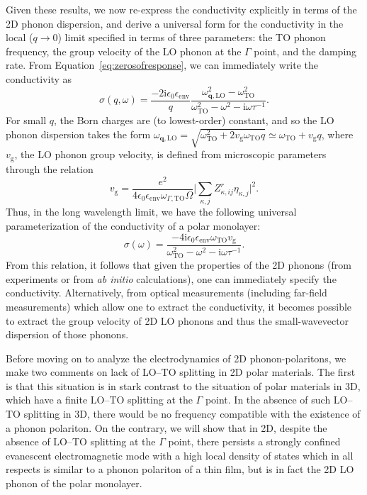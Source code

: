 \documentclass[aps,prb,twocolumn,
	           groupedaddress,superscriptaddress,
               amsfonts,amssymb,amsmath,floatfix,
	           citeautoscript]{revtex4-1}
\newcommand{\iu}{\mathrm{i}}
\begin{document}
Given these results, we now re-express the conductivity explicitly in terms of the 2D phonon dispersion, and derive a universal form for the conductivity in the local ($q\rightarrow 0$) limit specified in terms of three parameters: the TO phonon frequency, the group velocity of the LO phonon at the $\Gamma$ point, and the damping rate. From Equation~\eqref{eq:zerosofresponse}, we can immediately write the conductivity as
  \begin{equation}
  \sigma(q,\omega) = \frac{-2\iu\epsilon_0\epsilon_{\mathrm{env}}}{q}\frac{\omega^2_{\mathbf{q},\mathrm{LO}}-\omega^2_{\mathrm{TO}}}{\omega^2_{\mathrm{TO}}-\omega^2-\iu\omega\tau^{-1}}.
  \end{equation}
 For small $q$,  the Born charges are (to lowest-order) constant, and so the LO phonon dispersion takes the form $\omega_{\mathbf{q},\mathrm{LO}}=\sqrt{\omega^2_{\mathrm{TO}}+2v_{\mathrm{g}}\omega_{\mathrm{TO}}q} \simeq \omega_{\mathrm{TO}} + v_{\mathrm{g}}q$, where $v_{\mathrm{g}}$, the LO phonon group velocity, is defined from microscopic parameters through the relation
 \begin{equation}
    v_{\mathrm{g}} = \frac{e^2 }{4\epsilon_0 \epsilon_{\mathrm{env}}\omega_{\Gamma, \mathrm{TO}}\Omega}\Big|\sum\limits_{\kappa,j}Z^r_{\kappa,ij}\eta_{\kappa,j}  \Big|^2. 
\end{equation}
Thus, in the long wavelength limit, we have the following universal parameterization of the conductivity of a polar monolayer:
\begin{equation}
    \sigma(\omega) =  \frac{-4\iu\epsilon_0\epsilon_{\mathrm{env}}\omega_{\mathrm{TO}}v_{\mathrm{g}}}{\omega^2_{\mathrm{TO}}-\omega^2-\iu\omega\tau^{-1}}.
    \label{eq:localsigma}
\end{equation}
From this relation, it follows that given the properties of the 2D phonons (from experiments or from \emph{ab initio} calculations), one can immediately specify the conductivity. Alternatively, from optical measurements (including far-field measurements) which allow one to extract the conductivity, it becomes possible to extract the group velocity of 2D LO phonons and thus the small-wavevector dispersion of those phonons. 
  
Before moving on to analyze the electrodynamics of 2D phonon-polaritons, we make two comments on lack of LO--TO splitting in 2D polar materials. The first is that this situation is in stark contrast to the situation of polar materials in 3D, which have a finite LO--TO splitting at the $\Gamma$ point. In the absence of such LO--TO splitting in 3D, there would be no frequency compatible with the existence of a phonon  polariton. On the contrary, we will show that in 2D, despite the absence of LO--TO splitting at the $\Gamma$ point, there persists a strongly confined evanescent electromagnetic mode with a high local density of states which in all respects is similar to a phonon polariton of a thin film, but is in fact the 2D LO phonon of the polar monolayer.
\end{document}
